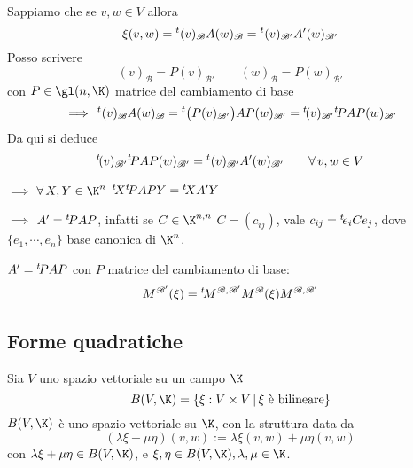 Sappiamo che se $ v, w \in V $ allora \[
    \xi(v,w)=\null^{t}(v)_{ \mathscr{B}} A (w)_{ \mathscr{B}}= \null^{t}(v)_{ \mathscr{B}'} A' (w)_{ \mathscr{B}'}
\] Posso scrivere \[
    (v)_{ \mathscr{B}}=P(v)_{ \mathscr{B}'}\qquad(w)_{ \mathscr{B}}=P(w)_{ \mathscr{B}'}
\] con $ P \in \gl(n, \K) $ matrice del cambiamento di base 
\[
   \,\implies\,  \null^{t}(v)_{ \mathscr{B}} A (w)_{ \mathscr{B}} =\null^{t}\bigl(P(v)_{ \mathscr{B}'}\bigr) A P (w)_{ \mathscr{B}'}= \null^{t}\!(v)_{ \mathscr{B}'} \null^{t}\!PAP (w)_{ \mathscr{B}'}
\] Da qui si deduce \[\null^{t}\!(v)_{ \mathscr{B}'} \null^{t}\!PAP (w)_{ \mathscr{B}'}=\null^{t}(v)_{ \mathscr{B}'} A' (w)_{ \mathscr{B}'}\qquad \forall\, v,w \in V\] 

$\implies$ $ \forall\, X,Y \in \K^{n} $ $ \null^{t}\!X\null^{t}\!PAPY=\null^{t}\!XA'Y $ 

$\implies$ $ A'=\null^{t}\!PAP $, infatti se $ C \in \K^{n,n} $ $ C=(c_{ij} ) $, vale $ c_{ij}= \null^{t}\!e_{i} C e_{j}   $, dove $ \{e_1, \cdots, e_{n} \} $ base canonica di $ \K^{n} $. 

$ A'= \null^{t}\!PAP$ con $ P$ matrice del cambiamento di base: \begin{equation}
    M^{ \mathscr{B}'}(\xi)=\null^{t}\!M^{ \mathscr{B}, \mathscr{B}'} M^{ \mathscr{B}}(\xi) M^{ \mathscr{B}, \mathscr{B}'}
\end{equation}





\subsection{Forme quadratiche}

Sia $ V $ uno spazio vettoriale su un campo $ \K $\[B(V, \K)=\{\xi: V\times V \,|\, \xi\text{ è bilineare}\} \]
$ B(V, \K) $ è uno spazio vettoriale su $ \K $, con la struttura data da \begin{equation}
    (\lambda\xi + \mu \eta)(v,w):= \lambda \xi (v,w)+ \mu \eta (v,w)
\end{equation} con $ \lambda\xi + \mu\eta \in B(V, \K) $, e $ \xi, \eta \in B(V, \K), \lambda, \mu \in \K $.

